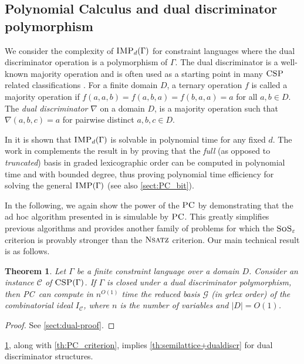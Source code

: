 \documentclass[11pt]{article}
\newcommand{\sos}{\text{\sc{SoS}}}
\newcommand{\Cc}{\mathcal{C}}
\newcommand{\CSP}{\textsc{CSP}}
\newcommand{\IMP}{\textsc{IMP}}
\newcommand{\PC}{\textsc{PC}}
\newcommand{\Nsatz}{\textsc{Nsatz}}
\newcommand{\grlex}{\textsf{grlex }}
\newcommand{\1}{\textbf{1}}
\newcommand{\GB}{\text{Gr\"{o}bner} }
\newtheorem{theorem}{Theorem}[section]
\begin{document}
\subsection{Polynomial Calculus and dual discriminator polymorphism}\label{sect:PCdual}
We consider the complexity of $\IMP_d(\Gamma)$ for constraint languages where the dual discriminator operation is a polymorphism of $\Gamma$. 
The dual discriminator is a well-known majority operation \cite{Jeavons:1997:CPC,barto_et_al:DFU:2017:6959} and is often used as a starting point in many $\CSP$ related classifications \cite{barto_et_al:DFU:2017:6959}. For a finite domain $D$, a ternary operation $f$ is called a majority operation if  $f(a,a,b)=f(a,b,a)=f(b,a,a)=a$ for all $a,b\in D$. The \emph{dual discriminator} $\nabla$ on a domain $D$, is a majority operation such that $\nabla(a,b,c)=a$ for pairwise distinct $a,b,c\in D$.

In \cite{BulatovRSTOC22} it is shown that $\IMP_d(\Gamma)$ is solvable in polynomial time for any fixed $d$. The work in \cite{BharathiM21} complements the result in \cite{BulatovRSTOC22} by proving that the \textit{full} (as opposed to \textit{truncated}) \GB basis in graded lexicographic order can be computed in polynomial time and with bounded degree, thus proving polynomial time efficiency for solving the general $\IMP(\Gamma)$ (see also \cref{sect:PC_bit}).

In the following, we again show the power of the $\PC$ by demonstrating that the ad hoc algorithm presented in \cite{BharathiM21} is simulable by $\PC$. 
This greatly simplifies previous algorithms \cite{BulatovRSTOC22, BharathiM21, BharathiM22} and provides another family of problems for which the $\sos_{\varepsilon}$ criterion is provably stronger than the $\Nsatz$ criterion.
Our main technical result is as follows.
\begin{theorem}\label{th:dual_discriminator}
    Let $\Gamma$ be a finite constraint language over a domain $D$. Consider an instance $\Cc$ of $\CSP(\Gamma)$. If $\Gamma$ is closed under a dual discriminator polymorphism, then \PC\ can compute in $n^{O(1)}$ time the reduced \GB basis $\mathcal{G}$ (in \grlex order) of the combinatorial ideal $I_\Cc$, where $n$ is the number of variables and $|D|=O(1)$.
\end{theorem}
\begin{proof}
    See \cref{sect:dual-proof}.
\end{proof}
\cref{th:dual_discriminator}, along with \cref{th:PC_criterion}, implies \cref{th:semilattice+dualdiscr} for dual discriminator structures. 
\end{document}
